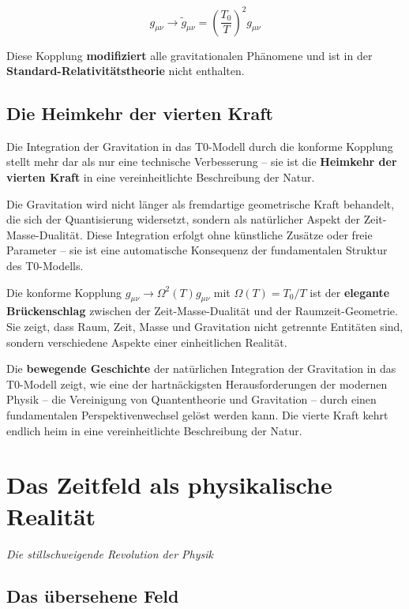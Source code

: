 \documentclass[12pt,a4paper]{report}
\begin{document}
	\begin{equation}
		g_{\mu\nu} \to \tilde{g}_{\mu\nu} = \left(\frac{T_0}{T}\right)^2 g_{\mu\nu}
	\end{equation}
	
	Diese Kopplung \textbf{modifiziert} alle gravitationalen Phänomene und ist in der \textbf{Standard-Relativitätstheorie} nicht enthalten.
	
	\section{Die Heimkehr der vierten Kraft}
	
	Die Integration der Gravitation in das T0-Modell durch die konforme Kopplung stellt mehr dar als nur eine technische Verbesserung -- sie ist die \textbf{Heimkehr der vierten Kraft} in eine vereinheitlichte Beschreibung der Natur. 
	
	Die Gravitation wird nicht länger als fremdartige geometrische Kraft behandelt, die sich der Quantisierung widersetzt, sondern als natürlicher Aspekt der Zeit-Masse-Dualität. Diese Integration erfolgt ohne künstliche Zusätze oder freie Parameter -- sie ist eine automatische Konsequenz der fundamentalen Struktur des T0-Modells.
	
	Die konforme Kopplung $g_{\mu\nu} \to \Omega^2(T) g_{\mu\nu}$ mit $\Omega(T) = T_0/T$ ist der \textbf{elegante Brückenschlag} zwischen der Zeit-Masse-Dualität und der Raumzeit-Geometrie. Sie zeigt, dass Raum, Zeit, Masse und Gravitation nicht getrennte Entitäten sind, sondern verschiedene Aspekte einer einheitlichen Realität.
	
	Die \textbf{bewegende Geschichte} der natürlichen Integration der Gravitation in das T0-Modell zeigt, wie eine der hartnäckigsten Herausforderungen der modernen Physik -- die Vereinigung von Quantentheorie und Gravitation -- durch einen fundamentalen Perspektivenwechsel gelöst werden kann. Die vierte Kraft kehrt endlich heim in eine vereinheitlichte Beschreibung der Natur.

	\chapter{Das Zeitfeld als physikalische Realität}
	\textit{Die stillschweigende Revolution der Physik}
	
	\section{Das übersehene Feld}
	
\end{document}

